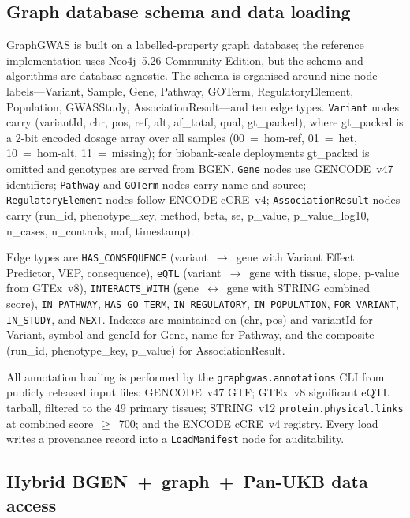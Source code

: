 \subsection*{Graph database schema and data loading}\label{methods:schema}

GraphGWAS is built on a labelled-property graph
database\cite{robinson2015graph}; the reference implementation
uses Neo4j~5.26 Community Edition, but the schema and algorithms
are database-agnostic. The schema is
organised around nine node labels---Variant, Sample, Gene, Pathway,
GOTerm, RegulatoryElement, Population, GWASStudy,
AssociationResult---and ten edge types. \texttt{Variant} nodes carry
(variantId, chr, pos, ref, alt, af\_total, qual, gt\_packed), where
gt\_packed is a 2-bit encoded dosage array over all samples
(00~=~hom-ref, 01~=~het, 10~=~hom-alt, 11~=~missing); for
biobank-scale deployments gt\_packed is omitted and genotypes are
served from BGEN. \texttt{Gene} nodes use GENCODE~v47 identifiers;
\texttt{Pathway} and \texttt{GOTerm} nodes carry name and source;
\texttt{RegulatoryElement} nodes follow ENCODE cCRE~v4;
\texttt{AssociationResult} nodes carry (run\_id, phenotype\_key,
method, beta, se, p\_value, p\_value\_log10, n\_cases, n\_controls,
maf, timestamp).

Edge types are \texttt{HAS\_CONSEQUENCE} (variant~$\rightarrow$~gene
with Variant Effect Predictor, VEP\cite{mclaren2016ensembl},
consequence), \texttt{eQTL} (variant~$\rightarrow$~gene with tissue,
slope, p-value from GTEx~v8\cite{gtex2020}), \texttt{INTERACTS\_WITH}
(gene~$\leftrightarrow$~gene with STRING combined score),
\texttt{IN\_PATHWAY}, \texttt{HAS\_GO\_TERM}, \texttt{IN\_REGULATORY},
\texttt{IN\_POPULATION}, \texttt{FOR\_VARIANT},
\texttt{IN\_STUDY}, and \texttt{NEXT}. Indexes are maintained on
(chr, pos) and variantId for Variant, symbol and geneId for Gene,
name for Pathway, and the composite (run\_id, phenotype\_key,
p\_value) for AssociationResult.

All annotation loading is performed by the
\texttt{graphgwas.annotations} CLI from publicly released input
files: GENCODE~v47 GTF\cite{frankish2023gencode}; GTEx~v8
significant eQTL tarball\cite{gtex2020}, filtered to the 49 primary
tissues; STRING~v12 \texttt{protein.physical.links} at combined
score~$\geq$~700\cite{szklarczyk2023string}; and the ENCODE cCRE~v4
registry\cite{encode2020expanded}. Every
load writes a provenance record into a \texttt{LoadManifest} node
for auditability.

\subsection*{Hybrid BGEN~+~graph~+~Pan-UKB data access}\label{methods:panukb}

